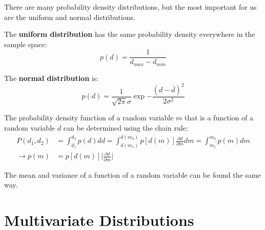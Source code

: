 \documentclass{article}
\begin{document}
There are many probability density distributions, but the most important for us are the uniform and normal distributions.

\begin{definition}
    The \textbf{uniform distribution} has the same probability density everywhere in the sample space:
    \[
        p(d)=\frac{1}{d_{max}-d_{min}}
    \]
\end{definition}

\begin{definition}
    The \textbf{normal distribution} is:
    \[
        p(d)=\frac{1}{\sqrt{2\pi }\sigma }\exp {-\frac{(d-\overline{d} )^2}{2\sigma ^2}}
    \]
\end{definition}

The probability density function of a random variable \(m\) that is a function of a random variable \(d\) can be determined using the chain rule:
\begin{align*}
    P(d_1,d_2)&=\int_{d_1}^{d_2}p(d)dd=\int_{d(m_1)}^{d(m_2)}p[d(m)]\frac{\partial d}{\partial m}dm=\int_{m_1}^{m_2}p(m)dm \\
    \rightarrow p(m)&=p[d(m)]\lvert \frac{\partial d}{\partial m}\rvert
\end{align*}

The mean and variance of a function of a random variable can be found the same way.

\section{Multivariate Distributions}
\end{document}
